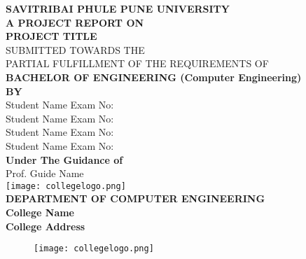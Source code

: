 \documentclass[oneside,a4paper,12pt]{report}
\begin{document}
\setlength{\parindent}{0mm}
\begin{center}
{\bfseries SAVITRIBAI PHULE PUNE UNIVERSITY \\}
 \vspace*{1\baselineskip}
{\bfseries A  PROJECT REPORT ON \\}
 \vspace*{2\baselineskip}
{\bfseries \fontsize{16}{12} \selectfont  PROJECT TITLE \\ \vspace*{2\baselineskip}}
{\fontsize{12}{12} \selectfont SUBMITTED TOWARDS THE
 \\PARTIAL FULFILLMENT OF THE REQUIREMENTS OF \\

\vspace*{2\baselineskip}}
{\bfseries \fontsize{14}{12} \selectfont BACHELOR OF ENGINEERING (Computer
Engineering) \\
\vspace*{1\baselineskip}} 
{\bfseries \fontsize{14}{12} \selectfont BY \\ 
\vspace*{1\baselineskip}} 
Student Name  \hspace{25 mm} Exam No:  \\
Student Name \hspace{25 mm} Exam No:   \\
Student Name \hspace{25 mm} Exam No:  \\
Student Name \hspace{25 mm} Exam No:\\
\vspace*{2\baselineskip}
{\bfseries \fontsize{14}{12} \selectfont Under The Guidance of \\  
\vspace*{2\baselineskip}} 
Prof. Guide Name\\
\texttt{[image: collegelogo.png]} \\
{\bfseries \fontsize{14}{12} \selectfont DEPARTMENT OF COMPUTER ENGINEERING \\
College Name \\
College Address 
}
\end{center}

\newpage



\begin{figure}[ht]
\centering
\texttt{[image: collegelogo.png]}
\end{figure}
\end{document}

